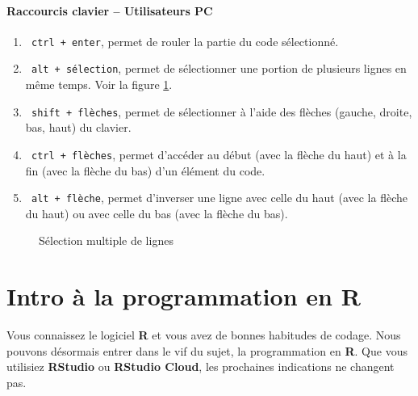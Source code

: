 \documentclass[10.5pt,a4paper]{article}
\newcommand{\rcode}[1]{\texttt{\color{rstudio} #1}}
\begin{document}
      \paragraph{Raccourcis clavier -- Utilisateurs PC}
      \begin{enumerate}
        \item \rcode{ctrl + enter}, permet de rouler la partie du code sélectionné.
        \item \rcode{alt + sélection}, permet de sélectionner une portion de plusieurs lignes en même temps. Voir la figure \ref{altSelect}.
        \item \rcode{shift + flèches}, permet de sélectionner à l'aide des flèches (gauche, droite, bas, haut) du clavier.
        \item \rcode{ctrl + flèches}, permet d'accéder au début (avec la flèche du haut) et à la fin (avec la flèche du bas) d'un élément du code.
        \item \rcode{alt + flèche}, permet d'inverser une ligne avec celle du haut (avec la flèche du haut) ou avec celle du bas (avec la flèche du bas).
      \end{enumerate}
      
            \begin{figure}[H]
      \centering
      \caption{Sélection multiple de lignes}
      \label{altSelect}
      \end{figure}
      
\section{Intro à la programmation en R}
Vous connaissez le logiciel \textbf{R} et vous avez de bonnes habitudes de codage. Nous pouvons désormais entrer dans le vif du sujet, la programmation en \textbf{R}. Que vous utilisiez \textbf{RStudio} ou \textbf{RStudio Cloud}, les prochaines indications ne changent pas. 
      
\end{document}
